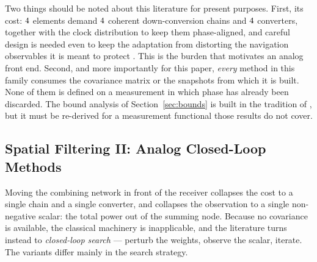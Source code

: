 \documentclass[journal]{IEEEtran}
\begin{document}
Two things should be noted about this literature for present purposes. First,
its cost: $4$ elements demand $4$ coherent down-conversion
chains and $4$ converters, together with the clock distribution to keep
them phase-aligned, and careful design is needed even to keep the adaptation
from distorting the navigation observables it is meant to protect
\cite{Zhang2012}. This is the burden that motivates an analog front end.
Second, and more importantly for this paper, \emph{every} method in this
family consumes the covariance matrix or the snapshots from which it is built.
None of them is defined on a measurement in which phase has already been
discarded. The bound analysis of Section~\ref{sec:bounds} is built in the
tradition of \cite{stoica1989}, but it must be re-derived for a measurement
functional those results do not cover.

\subsection{Spatial Filtering II: Analog Closed-Loop Methods}
\label{sec:lit:analog}

Moving the combining network in front of the receiver collapses the cost to a
single chain and a single converter, and collapses the observation to a single
non-negative scalar: the total power out of the summing node. Because no
covariance is available, the classical machinery is inapplicable, and the
literature turns instead to \emph{closed-loop search} --- perturb the weights,
observe the scalar, iterate. The variants differ mainly in the search strategy.
\end{document}
